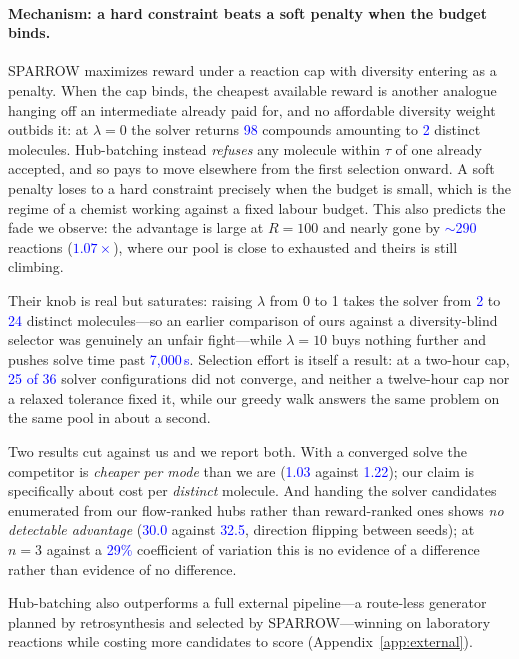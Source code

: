 \documentclass{article}
\newcommand{\checkval}[1]{\textcolor{blue}{#1}}
\begin{document}
\paragraph{Mechanism: a hard constraint beats a soft penalty when the budget binds.}
SPARROW maximizes reward under a reaction cap with diversity entering as a penalty. When
the cap binds, the cheapest available reward is another analogue hanging off an intermediate already paid for, and no affordable diversity weight outbids it: at $\lambda = 0$ the solver returns \checkval{98} compounds amounting to \checkval{2} distinct
molecules. Hub-batching instead \emph{refuses} any molecule within $\tau$ of one already accepted, and so pays to move elsewhere from the first selection onward. A soft penalty loses to a hard constraint precisely when the budget is small, which is the regime of a chemist working against a fixed labour budget. This also predicts the fade we observe: the advantage is large at $R = 100$ and nearly gone by \checkval{$\sim$290} reactions (\checkval{$1.07\times$}), where our pool is close to exhausted and theirs is still climbing.

Their knob is real but saturates: raising $\lambda$ from 0 to 1 takes the solver from \checkval{2} to \checkval{24} distinct molecules---so an earlier comparison of ours against a diversity-blind selector was genuinely an unfair fight---while $\lambda = 10$ buys nothing further and pushes solve time past \checkval{7{,}000\,s}. Selection effort is itself a result:
at a two-hour cap, \checkval{25 of 36} solver configurations did not converge, and neither a twelve-hour cap nor a relaxed tolerance fixed it, while our greedy walk answers the same problem on the same pool in about a second.

Two results cut against us and we report both. With a converged solve the competitor is \emph{cheaper per mode} than we are (\checkval{1.03} against \checkval{1.22}); our claim is specifically about cost per \emph{distinct} molecule. And handing the solver candidates enumerated from our flow-ranked hubs rather than reward-ranked ones shows \emph{no detectable advantage} (\checkval{30.0} against \checkval{32.5}, direction flipping between seeds); at $n=3$ against a \checkval{29\%} coefficient of variation this is no evidence of a difference rather than evidence of no difference.

Hub-batching also outperforms a full external pipeline---a route-less generator
\citep{kim2026s3gfn} planned by retrosynthesis and selected by SPARROW---winning
on laboratory reactions while costing more candidates to score
(Appendix~\ref{app:external}).
\end{document}
